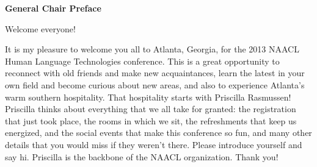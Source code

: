







%

\begin{center}
  {\Large \bf General Chair Preface} 
\end{center}

\vspace*{0.5cm}



Welcome everyone!

It is my pleasure to welcome you all to Atlanta, Georgia, for the 2013 NAACL Human Language Technologies conference.  This is a great opportunity to reconnect with old friends and make new acquaintances, learn the latest in your own field and become curious about new areas, and also to experience Atlanta's warm southern hospitality.
That hospitality starts with Priscilla Rasmussen! Priscilla thinks about everything that we all take for granted: the registration that just took place, the rooms in which we sit, the refreshments that keep us energized, and the social events that make this conference so fun, and many other details that you would miss if they weren't there. Please introduce yourself and say hi. Priscilla is the backbone of the NAACL organization. Thank you!

